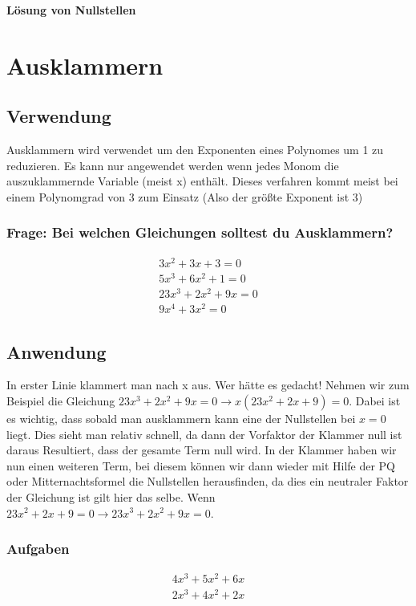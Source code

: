 \documentclass[11pt,a4paper]{article}
\author{Nico Fröhlich}
\begin{document}
\begin{center}
\huge \textbf{Lösung von Nullstellen}
\end{center}
\section{Ausklammern}
\subsection{Verwendung}
Ausklammern wird verwendet um den Exponenten eines Polynomes um 1 zu reduzieren. Es kann nur angewendet werden wenn jedes Monom die auszuklammernde Variable (meist x) enthält. Dieses verfahren kommt meist bei einem Polynomgrad von 3 zum Einsatz (Also der größte Exponent ist 3)

\subsubsection*{Frage: Bei welchen Gleichungen solltest du Ausklammern?}
\begin{eqnarray}
3x^2 + 3x + 3 = 0\\
5x^3 + 6x^2 + 1 = 0\\
23x^3 + 2x^2 + 9x = 0\\
9x^4 + 3x^2 = 0
\end{eqnarray}

\subsection{Anwendung}
In erster Linie klammert man nach x aus. Wer hätte es gedacht! Nehmen wir zum Beispiel die Gleichung $23x^3 + 2x^2 + 9x = 0 \rightarrow x(23x^2 + 2x + 9) = 0$. Dabei ist es wichtig, dass sobald man ausklammern kann eine der Nullstellen bei $x = 0$ liegt. Dies sieht man relativ schnell, da dann der Vorfaktor der Klammer null ist daraus Resultiert, dass der gesamte Term null wird. In der Klammer haben wir nun einen weiteren Term, bei diesem können wir dann wieder mit Hilfe der PQ oder Mitternachtsformel die Nullstellen herausfinden, da dies ein neutraler Faktor der Gleichung ist gilt hier das selbe. Wenn $23x^2 + 2x + 9 = 0 \rightarrow 23x^3 + 2x^2 + 9x = 0$.
\subsubsection*{Aufgaben}
\begin{eqnarray}
4x^3 + 5x^2 + 6x\\
2x^3 + 4x^2 + 2x
\end{eqnarray}
\end{document}
